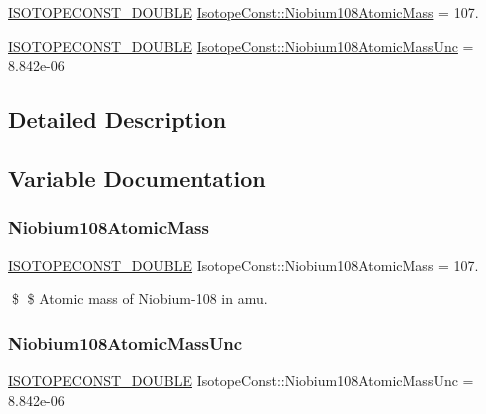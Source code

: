 \begin{DoxyCompactItemize}
\item 
\mbox{\hyperlink{group___isotope_const-_macros_ga8f45a7272ce02c0b4c65c44636ed719a}{I\+S\+O\+T\+O\+P\+E\+C\+O\+N\+S\+T\+\_\+\+D\+O\+U\+B\+LE}} \mbox{\hyperlink{group___isotope_const-_niobium-_nb108_ga41c89d7775cf740457630b8e4327caf6}{Isotope\+Const\+::\+Niobium108\+Atomic\+Mass}} = 107.
\item 
\mbox{\hyperlink{group___isotope_const-_macros_ga8f45a7272ce02c0b4c65c44636ed719a}{I\+S\+O\+T\+O\+P\+E\+C\+O\+N\+S\+T\+\_\+\+D\+O\+U\+B\+LE}} \mbox{\hyperlink{group___isotope_const-_niobium-_nb108_ga26215b8df0dbd55b94c90ef68edb36ba}{Isotope\+Const\+::\+Niobium108\+Atomic\+Mass\+Unc}} = 8.\+842e-\/06
\end{DoxyCompactItemize}


\subsection{Detailed Description}


\subsection{Variable Documentation}
\mbox{\label{group___isotope_const-_niobium-_nb108_ga41c89d7775cf740457630b8e4327caf6}} 
\subsubsection{\texorpdfstring{Niobium108\+Atomic\+Mass}{Niobium108AtomicMass}}
{\footnotesize\ttfamily \mbox{\hyperlink{group___isotope_const-_macros_ga8f45a7272ce02c0b4c65c44636ed719a}{I\+S\+O\+T\+O\+P\+E\+C\+O\+N\+S\+T\+\_\+\+D\+O\+U\+B\+LE}} Isotope\+Const\+::\+Niobium108\+Atomic\+Mass = 107.}

\$ \$ Atomic mass of Niobium-\/108 in amu. \mbox{\label{group___isotope_const-_niobium-_nb108_ga26215b8df0dbd55b94c90ef68edb36ba}} 
\subsubsection{\texorpdfstring{Niobium108\+Atomic\+Mass\+Unc}{Niobium108AtomicMassUnc}}
{\footnotesize\ttfamily \mbox{\hyperlink{group___isotope_const-_macros_ga8f45a7272ce02c0b4c65c44636ed719a}{I\+S\+O\+T\+O\+P\+E\+C\+O\+N\+S\+T\+\_\+\+D\+O\+U\+B\+LE}} Isotope\+Const\+::\+Niobium108\+Atomic\+Mass\+Unc = 8.\+842e-\/06}

